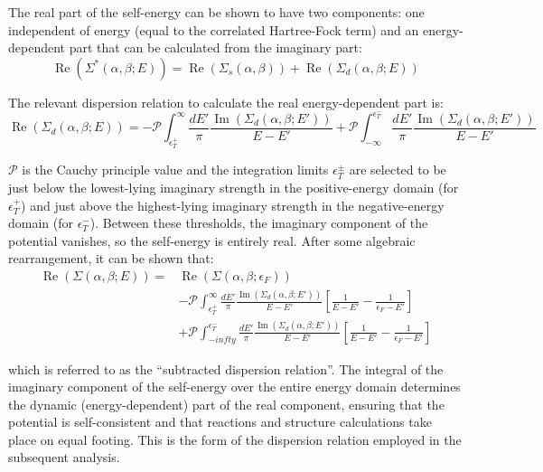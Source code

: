 The real part of the self-energy can be shown to have two components: one independent of energy
(equal to the correlated Hartree-Fock term)
and an energy-dependent part that can be calculated from the imaginary part:
\begin{equation} \label{RealPart}
    \operatorname{Re}(\Sigma^{*}(\alpha,\beta; E)) =
    \operatorname{Re}(\Sigma_{s}(\alpha,\beta)) +
    \operatorname{Re}({\Sigma_{d}(\alpha,\beta; E)})
\end{equation}

\noindent
The relevant dispersion relation to calculate the real energy-dependent part is:
\begin{equation} \label{DispersionRelation}
    \operatorname{Re}({\Sigma_{d}(\alpha,\beta; E)}) =
    -\mathcal{P}\int_{\epsilon^{+}_{T}}^{\infty}\frac{dE'}{\pi}
    \frac{\operatorname{Im}({\Sigma_{d}(\alpha,\beta; E')})}{E-E'}
    + \mathcal{P} \int_{-\infty}^{\epsilon^{-}_{T}}\frac{dE'}{\pi}
    \frac{\operatorname{Im}({\Sigma_{d}(\alpha,\beta; E')})}{E-E'}
\end{equation}

\noindent
$\mathcal{P}$ is the Cauchy principle value and the integration limits $\epsilon^{\pm}_{T}$ are
selected to be just below the lowest-lying imaginary strength in the positive-energy domain
(for $\epsilon^{+}_{T}$) and just above the highest-lying imaginary strength in the negative-energy
domain (for $\epsilon^{-}_{T}$). Between these thresholds, the imaginary component of the potential
vanishes, so the self-energy is entirely real. After some algebraic rearrangement,
it can be shown that:
\begin{equation} \label{SubtractedDispersionRelation}
    \begin{split}
        \operatorname{Re}({\Sigma(\alpha,\beta; E)}) =
        & \operatorname{Re}({\Sigma(\alpha,\beta;\epsilon_{F})})\\
        & -\mathcal{P}\int_{\epsilon^{+}_{T}}^{\infty}\frac{dE'}{\pi}
        \frac{\operatorname{Im}({\Sigma_{d}(\alpha,\beta; E')})}{E-E'}
        \left[\frac{1}{E-E'}-\frac{1}{\epsilon_{F}-E'}\right]\\
        & + \mathcal{P} \int_{-infty}^{\epsilon^{-}_{T}}\frac{dE'}{\pi}
        \frac{\operatorname{Im}({\Sigma_{d}(\alpha,\beta; E')})}{E-E'}
        \left[\frac{1}{E-E'}-\frac{1}{\epsilon_{F}-E'}\right]
    \end{split}
\end{equation}

\noindent
which is referred to as the ``subtracted dispersion relation''. The integral of the imaginary
component of the self-energy over the entire energy domain determines the dynamic (energy-dependent)
part of the real component, ensuring that the potential is self-consistent and that reactions and
structure calculations take place on equal footing. This is the form of the dispersion relation
employed in the subsequent analysis.

